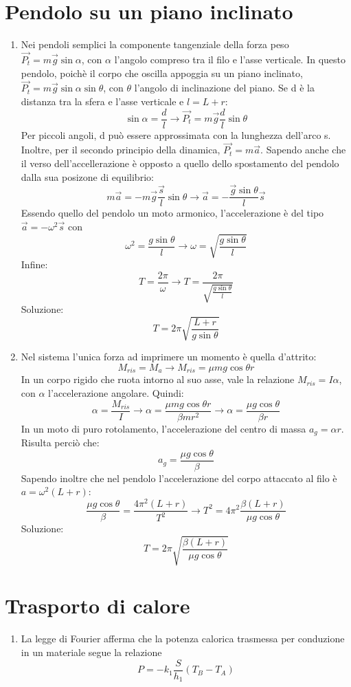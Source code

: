 \documentclass[]{article}
\begin{document}
\section{Pendolo su un piano inclinato}
\begin{enumerate}
	\item Nei pendoli semplici la componente tangenziale della forza peso $\vec{P_t}=m\vec{g}\sin{\alpha}$, con $\alpha$ l'angolo compreso tra il filo e l'asse verticale. In questo pendolo, poichè il corpo che oscilla appoggia su un piano inclinato, $\vec{P_t}=m\vec{g}\sin{\alpha}\sin{\theta}$, con $\theta$ l'angolo di inclinazione del piano. Se d è la distanza tra la sfera e l'asse verticale e $l=L+r$:
	$$\sin{\alpha}=\frac{d}{l} \rightarrow \vec{P_t}=m\vec{g}\frac{d}{l}\sin{\theta}$$
	Per piccoli angoli, d può essere approssimata con la lunghezza dell'arco s. Inoltre, per il secondo principio della dinamica, $\vec{P_t}=m\vec{a}$. Sapendo anche che il verso dell'accellerazione è opposto a quello dello spostamento del pendolo dalla sua posizone di equilibrio:
	$$m\vec{a}=-m\vec{g}\frac{\vec{s}}{l}\sin{\theta} \rightarrow \vec{a}=-\frac{\vec{g}\sin{\theta}}{l}\vec{s}$$
	Essendo quello del pendolo un moto armonico, l'accelerazione è del tipo $\vec{a}=-\omega^2\vec{s}$ con
	$$\omega^2=\frac{g\sin{\theta}}{l} \rightarrow \omega=\sqrt{\frac{g\sin{\theta}}{l}}$$
	Infine:
	$$T=\frac{2\pi}{\omega} \rightarrow T=\frac{2\pi}{\sqrt{\frac{g\sin{\theta}}{l}}}$$
	Soluzione:
	$$T=2\pi\sqrt{\frac{L+r}{g\sin{\theta}}}$$

	\item Nel sistema l'unica forza ad imprimere un momento è quella d'attrito:
	$$M_{ris}=M_a \rightarrow M_{ris}=\mu mg\cos{\theta}r$$
	In un corpo rigido che ruota intorno al suo asse, vale la relazione $M_{ris}=I\alpha$, con $\alpha$ l'accelerazione angolare. Quindi:
	$$\alpha=\frac{M_{ris}}{I} \rightarrow \alpha=\frac{\mu mg\cos{\theta}r}{\beta mr^2} \rightarrow \alpha=\frac{\mu g\cos{\theta}}{\beta r}$$
	In un moto di puro rotolamento, l'accelerazione del centro di massa $a_g=\alpha r$. Risulta perciò che:
	$$a_g=\frac{\mu g\cos{\theta}}{\beta}$$
	Sapendo inoltre che nel pendolo l'accelerazione del corpo attaccato al filo è $a=\omega^2(L+r)$:
	$$\frac{\mu g\cos{\theta}}{\beta}=\frac{4\pi^2(L+r)}{T^2} \rightarrow T^2=4\pi^2\frac{\beta(L+r)}{\mu g\cos{\theta}}$$
	Soluzione:
	$$T=2\pi\sqrt{\frac{\beta(L+r)}{\mu g\cos{\theta}}}$$
\end{enumerate}

\section{Trasporto di calore}
	\begin{enumerate}
		\item La legge di Fourier afferma che la potenza calorica trasmessa per conduzione in un materiale segue la relazione
			$$P=-k_1\frac{S}{h_1}(T_B-T_A)$$
	\end{enumerate}
\end{document}
